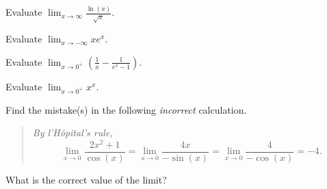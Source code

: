 \documentclass[../main.tex]{subfiles}
\begin{document}
\begin{exercise}
  Evaluate \(\lim_{x \to \infty} \frac{\ln(x)}{\sqrt{x}}\).

  \blanks*
\end{exercise}
\clearpage

\begin{exercise}
  Evaluate \(\lim_{x \to -\infty} x e^{x}\).

  \blanks*
\end{exercise}

\begin{exercise}
  Evaluate \(\lim_{x \to 0^{+}} \left(\frac{1}{x} - \frac{1}{e^{x} - 1}\right)\).  

  \blanks*
\end{exercise}
\clearpage

\begin{exercise}
  Evaluate \(\lim_{x \to 0^{+}} x^{x}\).

  \blanks*
\end{exercise}

\begin{exercise}
  Find the mistake(s) in the following \emph{incorrect} calculation.
  \bigskip

  \begin{quote}
    \itshape
    By l'H\^opital's rule,
    \[
      \lim_{x \to 0} \frac{2x^{2} + 1}{\cos(x)} = \lim_{x \to 0} \frac{4x}{-\sin(x)} = \lim_{x \to 0} \frac{4}{-\cos(x)} = -4.
    \]
  \end{quote}

  What is the correct value of the limit?

  \blanks*
\end{exercise}
\clearpage
\end{document}

